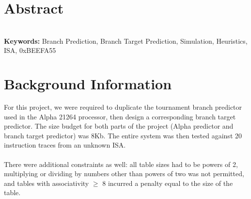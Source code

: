 \documentclass[twocolumn]{article}
\begin{document}
\section{Abstract}
\textit{  }\\

\textbf{Keywords:} Branch Prediction, Branch Target Prediction, Simulation, Heuristics, ISA, 0xBEEFA55

\section{Background Information}
For this project, we were required to duplicate the tournament branch predictor used in the Alpha 21264 processor, then design a corresponding branch target predictor.  The size budget for both parts of the project (Alpha predictor and branch target predictor) was 8Kb.  The entire system was then tested against 20 instruction traces from an unknown ISA. \\\\
There were additional constraints as well: all table sizes had to be powers of 2, multiplying or dividing by numbers other than powers of two was not permitted, and tables with associativity $\ge$ 8 incurred a penalty equal to the size of the table.
\end{document}
